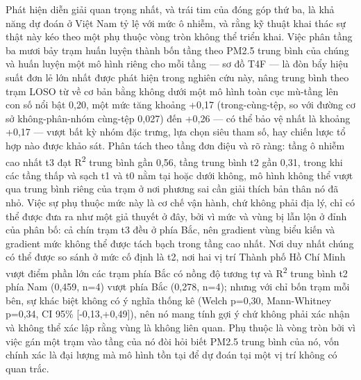 Phát hiện diễn giải quan trọng nhất, và trái tim của đóng góp thứ ba, là khả năng dự đoán ở Việt Nam tỷ lệ với mức ô nhiễm, và rằng kỹ thuật khai thác sự thật này kéo theo một phụ thuộc vòng tròn không thể triển khai. Việc phân tầng ba mươi bảy trạm huấn luyện thành bốn tầng theo PM2.5 trung bình của chúng và huấn luyện một mô hình riêng cho mỗi tầng --- sơ đồ T4F --- là đòn bẩy hiệu suất đơn lẻ lớn nhất được phát hiện trong nghiên cứu này, nâng trung bình theo trạm LOSO từ về cơ bản bằng không dưới một mô hình toàn cục mù-tầng lên con số nổi bật 0,20, một mức tăng khoảng +0,17 (trong-cùng-tệp, so với đường cơ sở không-phân-nhóm cùng-tệp 0,027) đến +0,26 --- có thể bảo vệ nhất là khoảng +0,17 --- vượt bất kỳ nhóm đặc trưng, lựa chọn siêu tham số, hay chiến lược tổ hợp nào được khảo sát. Phân tách theo tầng đơn điệu và rõ ràng: tầng ô nhiễm cao nhất t3 đạt R\textsuperscript{2} trung bình gần 0,56, tầng trung bình t2 gần 0,31, trong khi các tầng thấp và sạch t1 và t0 nằm tại hoặc dưới không, mô hình không thể vượt qua trung bình riêng của trạm ở nơi phương sai cần giải thích bản thân nó đã nhỏ. Việc sự phụ thuộc mức này là cơ chế vận hành, chứ không phải địa lý, chỉ có thể được đưa ra như một giả thuyết ở đây, bởi vì mức và vùng bị lẫn lộn ở đỉnh của phân bố: cả chín trạm t3 đều ở phía Bắc, nên gradient vùng biểu kiến và gradient mức không thể được tách bạch trong tầng cao nhất. Nơi duy nhất chúng có thể được so sánh ở mức cố định là t2, nơi hai vị trí Thành phố Hồ Chí Minh vượt điểm phần lớn các trạm phía Bắc có nồng độ tương tự và R\textsuperscript{2} trung bình t2 phía Nam (0,459, n=4) vượt phía Bắc (0,278, n=4); nhưng với chỉ bốn trạm mỗi bên, sự khác biệt không có ý nghĩa thống kê (Welch p=0,30, Mann-Whitney p=0,34, CI 95\% [-0,13,+0,49]), nên nó mang tính gợi ý chứ không phải xác nhận và không thể xác lập rằng vùng là không liên quan. Phụ thuộc là vòng tròn bởi vì việc gán một trạm vào tầng của nó đòi hỏi biết PM2.5 trung bình của nó, vốn chính xác là đại lượng mà mô hình tồn tại để dự đoán tại một vị trí không có quan trắc.

